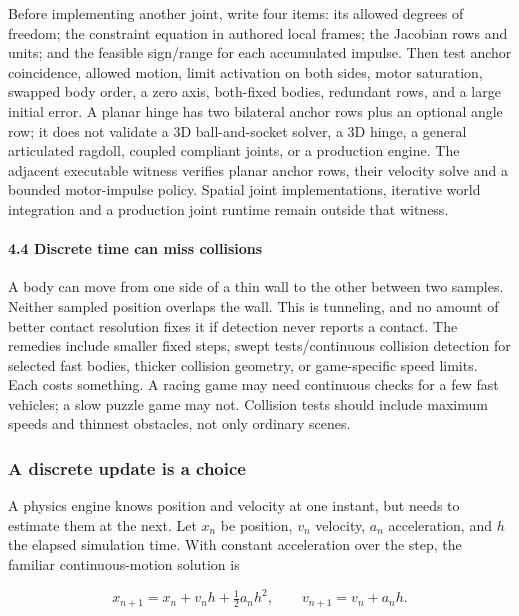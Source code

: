 Before implementing another joint, write four items: its allowed degrees of freedom; the constraint equation in authored local frames; the Jacobian rows and units; and the feasible sign/range for each accumulated impulse. Then test anchor coincidence, allowed motion, limit activation on both sides, motor saturation, swapped body order, a zero axis, both-fixed bodies, redundant rows, and a large initial error. A planar hinge has two bilateral anchor rows plus an optional angle row; it does not validate a 3D ball-and-socket solver, a 3D hinge, a general articulated ragdoll, coupled compliant joints, or a production engine. The adjacent executable witness verifies planar anchor rows, their velocity solve and a bounded motor-impulse policy. Spatial joint implementations, iterative world integration and a production joint runtime remain outside that witness.

\paragraph{4.4 Discrete time can miss collisions}\label{06-engine-ii-ch033-discrete-time-can-miss-collisions}

A body can move from one side of a thin wall to the other between two samples. Neither sampled position overlaps the wall. This is tunneling, and no amount of better contact resolution fixes it if detection never reports a contact. The remedies include smaller fixed steps, swept tests/continuous collision detection for selected fast bodies, thicker collision geometry, or game-specific speed limits. Each costs something. A racing game may need continuous checks for a few fast vehicles; a slow puzzle game may not. Collision tests should include maximum speeds and thinnest obstacles, not only ordinary scenes.

\subsubsection{A discrete update is a choice}\label{06-engine-ii-ch033-a-discrete-update-is-a-choice}

A physics engine knows position and velocity at one instant, but needs to estimate them at the next. Let \(x_n\) be position, \(v_n\) velocity, \(a_n\) acceleration, and \(h\) the elapsed simulation time. With constant acceleration over the step, the familiar continuous-motion solution is

\[
x_{n+1}=x_n+v_n h+\tfrac12 a_n h^2, \qquad v_{n+1}=v_n+a_n h.
\]


